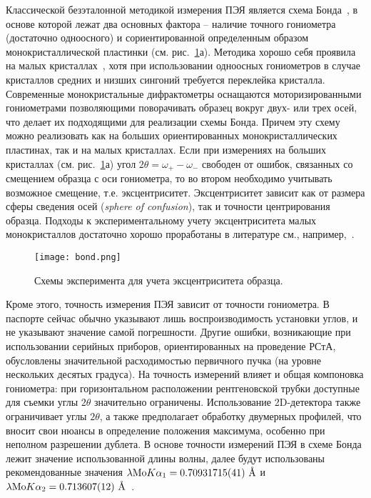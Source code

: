 Классической безэталонной методикой измерения ПЭЯ является схема Бонда~\cite{Bond:1960}, в основе которой лежат два основных фактора – наличие точного гониометра (достаточно одноосного) и сориентированной определенным образом монокристаллической пластинки (см. рис.~\ref{fig:bond}а).
Методика хорошо себя проявила на малых кристаллах~\cite{Lisoivan:1988}, хотя при использовании одноосных гониометров в случае кристаллов средних и низших сингоний требуется переклейка кристалла.
Современные монокристальные дифрактометры оснащаются моторизированными гониометрами позволяющими поворачивать образец вокруг двух- или трех осей, что делает их подходящими для реализации схемы Бонда.
Причем эту схему можно реализовать как на больших ориентированных монокристаллических пластинах, так и на малых кристаллах.
Если при измерениях на больших кристаллах (см. рис.~\ref{fig:bond}а) угол $2\theta = \omega_+ - \omega_-$ свободен от ошибок, связанных со смещением образца с оси гониометра, то во втором необходимо учитывать возможное смещение, т.е. эксцентриситет.
Эксцентриситет зависит как от размера сферы сведения осей (\textit{sphere of confusion}), так и точности центрирования образца.
Подходы к экспериментальному учету эксцентриситета малых монокристаллов достаточно хорошо проработаны в литературе см., например,~\cite{Ponomarev:1969,King:1979}.

\begin{figure}[ht!]
    \centering
    \texttt{[image: bond.png]}
    \caption{Схемы эксперимента для учета эксцентриситета образца.}%
    \label{fig:bond}
\end{figure}

Кроме этого, точность измерения ПЭЯ зависит от точности гониометра.
В паспорте сейчас обычно указывают лишь воспроизводимость установки углов, и не указывают значение самой погрешности.
Другие ошибки, возникающие при использовании серийных приборов, ориентированных на проведение РСтА, обусловлены значительной расходимостью первичного пучка (на уровне нескольких десятых градуса).
На точность измерений влияет и общая компоновка гониометра: при горизонтальном расположении рентгеновской трубки доступные для съемки углы $2\theta$ значительно ограничены.
Использование 2D-детектора также ограничивает углы $2\theta$, а также предполагает обработку двумерных профилей, что вносит свои нюансы в определение положения максимума, особенно при неполном разрешении дублета.
В основе точности измерений ПЭЯ в схеме Бонда лежит значение использованной длины волны, далее будут использованы рекомендованные значения $\lambda \text{Mo} K \alpha_1 = 0.70931715 (41)\ \text{\AA}$ и $\lambda \text{Mo} K \alpha_2 = 0.713607 (12)\ \text{\AA}$~\cite{Deslattes:1985}.

